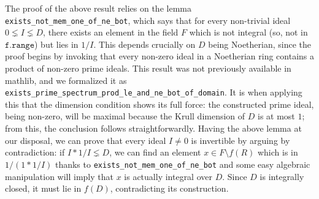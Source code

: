 \documentclass[a4paper,USenglish,cleveref, autoref, thm-restate]{lipics-v2021}
\newcommand{\lean}[1]{\texttt{#1}\xspace} %
\newcommand{\mathlib}{\textsf{mathlib}\xspace}
\begin{document}
The proof of the above result relies on the lemma \lean{exists\_not\_mem\_one\_of\_ne\_bot}, which says that for every non-trivial ideal $0\lneq I\lneq D$, there exists an element in the field $F$ which is not integral (so, not in $\lean{f.range}$) but lies in $1/I$. This depends crucially on $D$ being Noetherian, since the proof begins by invoking that every non-zero ideal in a Noetherian ring contains a product of non-zero prime ideals. This result was not previously available in \mathlib, and we formalized it as \lean{exists\_prime\_spectrum\_prod\_le\_and\_ne\_bot\_of\_domain}. It is when applying this that the dimension condition shows its full force: the constructed prime ideal, being non-zero, will be maximal because the Krull dimension of $D$ is at most $1$; from this, the conclusion follows straightforwardly. Having the above lemma at our disposal, we can prove that every ideal $I\ne 0$ is invertible by arguing by contradiction: if $I\ast 1/I\lneq D$, we can find an element $x\in F\setminus f(R)$ which is in $1/(1\ast 1/I)$ thanks to \lean{exists\_not\_mem\_one\_of\_ne\_bot} and some easy algebraic manipulation will imply that $x$ is actually integral over $D$. Since $D$ is integrally closed, it must lie in $f(D)$, contradicting its construction.
\end{document}

